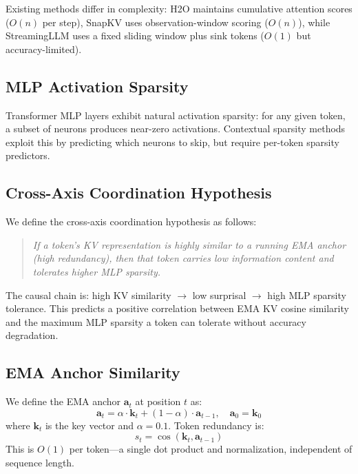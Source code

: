\documentclass[11pt]{article}
\begin{document}
Existing methods differ in complexity: H2O maintains cumulative attention scores ($O(n)$ per step), SnapKV uses observation-window scoring ($O(n)$), while StreamingLLM uses a fixed sliding window plus sink tokens ($O(1)$ but accuracy-limited).

\subsection{MLP Activation Sparsity}

Transformer MLP layers exhibit natural activation sparsity: for any given token, a subset of neurons produces near-zero activations. Contextual sparsity methods \citep{liu2023dejavu} exploit this by predicting which neurons to skip, but require per-token sparsity predictors.

\subsection{Cross-Axis Coordination Hypothesis}

We define the cross-axis coordination hypothesis as follows:

\begin{quote}
\emph{If a token's KV representation is highly similar to a running EMA anchor (high redundancy), then that token carries low information content and tolerates higher MLP sparsity.}
\end{quote}

The causal chain is: high KV similarity $\rightarrow$ low surprisal $\rightarrow$ high MLP sparsity tolerance. This predicts a positive correlation between EMA KV cosine similarity and the maximum MLP sparsity a token can tolerate without accuracy degradation.

\subsection{EMA Anchor Similarity}

We define the EMA anchor $\mathbf{a}_t$ at position $t$ as:
\begin{equation}
\mathbf{a}_t = \alpha \cdot \mathbf{k}_t + (1 - \alpha) \cdot \mathbf{a}_{t-1}, \quad \mathbf{a}_0 = \mathbf{k}_0
\end{equation}
where $\mathbf{k}_t$ is the key vector and $\alpha = 0.1$. Token redundancy is:
\begin{equation}
s_t = \cos(\mathbf{k}_t, \mathbf{a}_{t-1})
\end{equation}
This is $O(1)$ per token---a single dot product and normalization, independent of sequence length.
\end{document}
